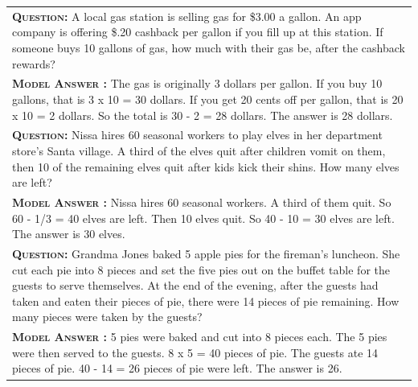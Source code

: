 \begin{table}[ht]
\begin{tabular}{p{\linewidth}}
        \midrule
        \vspace{-2mm}
        \textbf{\textsc{Question:}} A local gas station is selling gas for \$3.00 a gallon.  An app company is offering \$.20 cashback per gallon if you fill up at this station.  If someone buys 10 gallons of gas, how much with their gas be, after the cashback rewards? \\
        \vspace{-1mm}
        \textbf{\textsc{Model Answer \color{darkGreen}{(correct but imperfect equation)}:}} The gas is originally 3 dollars per gallon. If you buy 10 gallons, that is 3 x 10 = 30 dollars. {\color{blue} If you get 20 cents off per gallon, that is 20 x 10 = 2 dollars.} So the total is 30 - 2 = 28 dollars. The answer is 28 dollars. \\
        \midrule
        \vspace{-2mm}
        \textbf{\textsc{Question:}} Nissa hires 60 seasonal workers to play elves in her department store's Santa village. A third of the elves quit after children vomit on them, then 10 of the remaining elves quit after kids kick their shins. How many elves are left? \\
        \vspace{-1mm}
        \textbf{\textsc{Model Answer \color{darkGreen}{(correct but imperfect equation)}:}} Nissa hires 60 seasonal workers. A third of them quit. {\color{blue} So 60 - 1/3 = 40 elves are left.} Then 10 elves quit. So 40 - 10 = 30 elves are left. The answer is 30 elves. \\
        \midrule
        \vspace{-2mm}
        \textbf{\textsc{Question:}} Grandma Jones baked 5 apple pies for the fireman's luncheon.  She cut each pie into 8 pieces and set the five pies out on the buffet table for the guests to serve themselves.  At the end of the evening, after the guests had taken and eaten their pieces of pie, there were 14 pieces of pie remaining.  How many pieces were taken by the guests? \\
        \vspace{-1mm}
        \textbf{\textsc{Model Answer \color{darkGreen}{(correct but inverted semantics)}:}} 5 pies were baked and cut into 8 pieces each.  The 5 pies were then served to the guests.  8 x 5 = 40 pieces of pie.  {\color{blue} The guests ate 14 pieces of pie.  40 - 14 = 26 pieces of pie were left.}  The answer is 26. \color{darkGreen}{\checkmark} \\
        \bottomrule
    \end{tabular}
    \label{tab:appendix-gsm8k-correct-analysis}
\end{table}
\endgroup